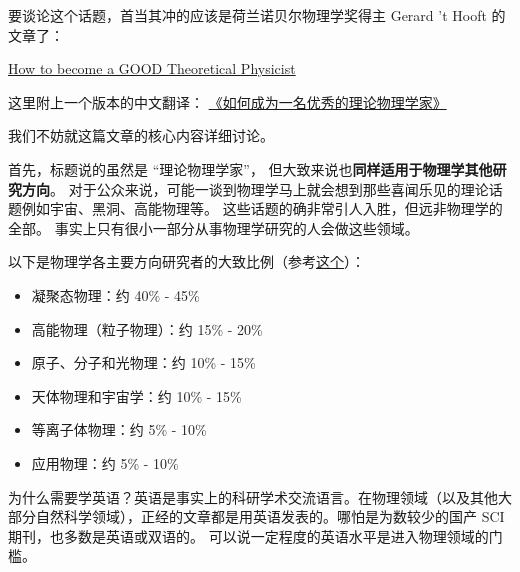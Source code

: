 
要谈论这个话题，首当其冲的应该是荷兰诺贝尔物理学奖得主 Gerard 't Hooft 的文章了：

\href{https://webspace.science.uu.nl/~hooft101/theorist.html}{How to become a GOOD Theoretical Physicist}

这里附上一个版本的中文翻译： \href{https://xialab.pku.edu.cn/kytdyw1/zdylm.m.jsp?wbtreeid=1011&tstreeid=11956&_t_uid=2945&language=en&homepageuuid=BF649325C5584FC683CE0B601D21AC65&templateuuid=4CC182410BA14FF8B55ED726FB2087FB&producttype=0&_tmode_=99&tsitesapptype=zdylm}{《如何成为一名优秀的理论物理学家》}

我们不妨就这篇文章的核心内容详细讨论。

首先，标题说的虽然是 “理论物理学家”， 但大致来说也\textbf{同样适用于物理学其他研究方向}。 对于公众来说，可能一谈到物理学马上就会想到那些喜闻乐见的理论话题例如宇宙、黑洞、高能物理等。 这些话题的确非常引人入胜，但远非物理学的全部。 事实上只有很小一部分从事物理学研究的人会做这些领域。 

以下是物理学各主要方向研究者的大致比例（参考\href{https://ww2.aip.org/statistics/trends-in-physics-phds}{这个}）：
\begin{itemize}
\item 凝聚态物理：约 40\% - 45\%
\item 高能物理（粒子物理）：约 15\% - 20\%
\item 原子、分子和光物理：约 10\% - 15\%
\item 天体物理和宇宙学：约 10\% - 15\%
\item 等离子体物理：约 5\% - 10\%
\item 应用物理：约 5\% - 10\%
\end{itemize}


为什么需要学英语？英语是事实上的科研学术交流语言。在物理领域（以及其他大部分自然科学领域），正经的文章都是用英语发表的。哪怕是为数较少的国产 SCI 期刊，也多数是英语或双语的。 可以说一定程度的英语水平是进入物理领域的门槛。


